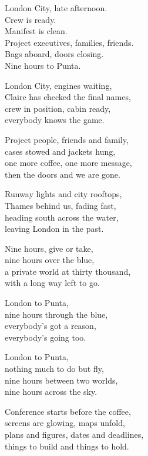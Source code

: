 \begin{lyrics}

London City, late afternoon.\\
Crew is ready.\\
Manifest is clean.\\
Project executives, families, friends.\\
Bags aboard, doors closing.\\
Nine hours to Punta.


London City, engines waiting,\\
Claire has checked the final names,\\
crew in position, cabin ready,\\
everybody knows the game.

Project people, friends and family,\\
cases stowed and jackets hung,\\
one more coffee, one more message,\\
then the doors and we are gone.

Runway lights and city rooftops,\\
Thames behind us, fading fast,\\
heading south across the water,\\
leaving London in the past.


Nine hours, give or take,\\
nine hours over the blue,\\
a private world at thirty thousand,\\
with a long way left to go.


London to Punta,\\
nine hours through the blue,\\
everybody's got a reason,\\
everybody's going too.

London to Punta,\\
nothing much to do but fly,\\
nine hours between two worlds,\\
nine hours across the sky.


Conference starts before the coffee,\\
screens are glowing, maps unfold,\\
plans and figures, dates and deadlines,\\
things to build and things to hold.


\end{lyrics}
